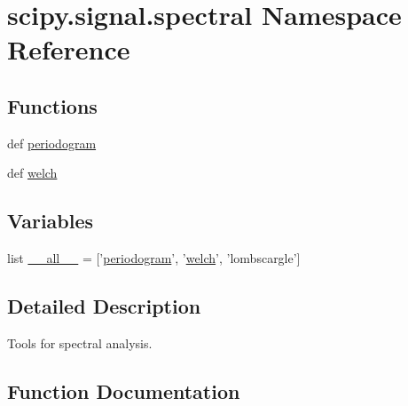 \hypertarget{namespacescipy_1_1signal_1_1spectral}{}\section{scipy.\+signal.\+spectral Namespace Reference}
\label{namespacescipy_1_1signal_1_1spectral}
\subsection*{Functions}
\begin{DoxyCompactItemize}
\item 
def \hyperlink{namespacescipy_1_1signal_1_1spectral_a2f86d8b609b628a178624dedb5f4d748}{periodogram}
\item 
def \hyperlink{namespacescipy_1_1signal_1_1spectral_a31306dc6d64cbd234911b2633b1e4ad3}{welch}
\end{DoxyCompactItemize}
\subsection*{Variables}
\begin{DoxyCompactItemize}
\item 
list \hyperlink{namespacescipy_1_1signal_1_1spectral_ab99b4dee92b82cefec0541361ba8fd3b}{\+\_\+\+\_\+all\+\_\+\+\_\+} = \mbox{[}'\hyperlink{namespacescipy_1_1signal_1_1spectral_a2f86d8b609b628a178624dedb5f4d748}{periodogram}', '\hyperlink{namespacescipy_1_1signal_1_1spectral_a31306dc6d64cbd234911b2633b1e4ad3}{welch}', 'lombscargle'\mbox{]}
\end{DoxyCompactItemize}


\subsection{Detailed Description}
\begin{DoxyVerb}Tools for spectral analysis.
\end{DoxyVerb}
 

\subsection{Function Documentation}
\hypertarget{namespacescipy_1_1signal_1_1spectral_a2f86d8b609b628a178624dedb5f4d748}{}
